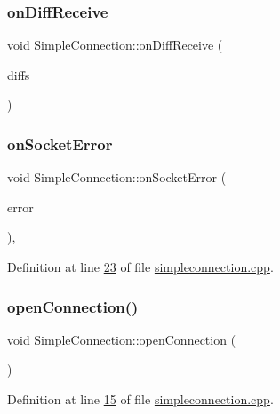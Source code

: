 \subsubsection{\texorpdfstring{on\+Diff\+Receive}{onDiffReceive}}
{\footnotesize\ttfamily void Simple\+Connection\+::on\+Diff\+Receive (\begin{DoxyParamCaption}\item[{Q\+List$<$ \hyperlink{a00141}{Diff\+Element} $\ast$$>$ $\ast$}]{diffs }\end{DoxyParamCaption})\hspace{0.3cm}{\ttfamily [signal]}}

\mbox{\label{a00125_a8360af71c89a54be93430b746d5fae08}} 
\subsubsection{\texorpdfstring{on\+Socket\+Error}{onSocketError}}
{\footnotesize\ttfamily void Simple\+Connection\+::on\+Socket\+Error (\begin{DoxyParamCaption}\item[{Q\+Abstract\+Socket\+::\+Socket\+Error}]{error }\end{DoxyParamCaption})\hspace{0.3cm}{\ttfamily [protected]}, {\ttfamily [slot]}}



Definition at line \hyperlink{a00005_source_l00023}{23} of file \hyperlink{a00005_source}{simpleconnection.\+cpp}.

\mbox{\label{a00125_a47370c85490330b8e1dd64af9e70b683}} 
\subsubsection{\texorpdfstring{open\+Connection()}{openConnection()}}
{\footnotesize\ttfamily void Simple\+Connection\+::open\+Connection (\begin{DoxyParamCaption}{ }\end{DoxyParamCaption})}



Definition at line \hyperlink{a00005_source_l00015}{15} of file \hyperlink{a00005_source}{simpleconnection.\+cpp}.

